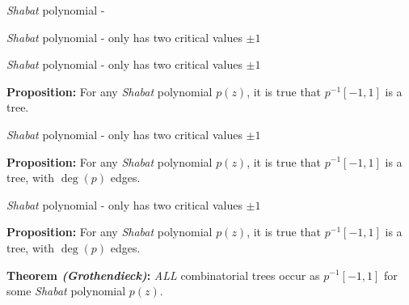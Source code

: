 \documentclass{beamer}
\begin{document}
\begin{frame}

{\it Shabat} polynomial - 

\end{frame}


\begin{frame}

{\it Shabat} polynomial - only has two critical values $\pm 1$

\end{frame}



\begin{frame}

{\it Shabat} polynomial - only has two critical values $\pm 1$

\vspace{5mm}

{\bf Proposition:} For any {\it Shabat} polynomial $p(z)$, it is true that $p^{-1}[-1,1]$ is a tree.

\end{frame}




\begin{frame}

{\it Shabat} polynomial - only has two critical values $\pm 1$

\vspace{5mm}

{\bf Proposition:} For any {\it Shabat} polynomial $p(z)$, it is true that $p^{-1}[-1,1]$ is a tree, with $\deg(p)$ edges.

\end{frame}





\begin{frame}

{\it Shabat} polynomial - only has two critical values $\pm 1$

\vspace{5mm}

{\bf Proposition:} For any {\it Shabat} polynomial $p(z)$, it is true that $p^{-1}[-1,1]$ is a tree, with $\deg(p)$ edges.

\vspace{5mm} 

{\bf Theorem {\it (Grothendieck)}:} {\it ALL} combinatorial trees occur as $p^{-1}[-1,1]$ for some {\it Shabat} polynomial $p(z)$.

\vspace{5mm}

\end{frame}
\end{document}
